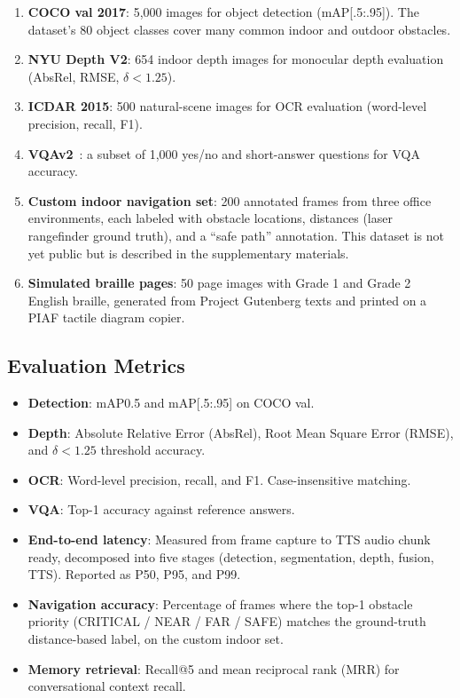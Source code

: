 \begin{enumerate}
    \item \textbf{COCO val 2017}: 5,000 images for object detection (mAP\@[.5:.95]). The dataset's 80 object classes cover many common indoor and outdoor obstacles.
    \item \textbf{NYU Depth V2}: 654 indoor depth images for monocular depth evaluation (AbsRel, RMSE, $\delta < 1.25$).
    \item \textbf{ICDAR 2015}: 500 natural-scene images for OCR evaluation (word-level precision, recall, F1).
    \item \textbf{VQAv2}~\cite{antol2015vqa}: a subset of 1,000 yes/no and short-answer questions for VQA accuracy.
    \item \textbf{Custom indoor navigation set}: 200 annotated frames from three office environments, each labeled with obstacle locations, distances (laser rangefinder ground truth), and a ``safe path'' annotation. This dataset is not yet public but is described in the supplementary materials.
    \item \textbf{Simulated braille pages}: 50 page images with Grade 1 and Grade 2 English braille, generated from Project Gutenberg texts and printed on a PIAF tactile diagram copier.
\end{enumerate}

\subsection{Evaluation Metrics}

\begin{itemize}
    \item \textbf{Detection}: mAP\@0.5 and mAP\@[.5:.95] on COCO val.
    \item \textbf{Depth}: Absolute Relative Error (AbsRel), Root Mean Square Error (RMSE), and $\delta < 1.25$ threshold accuracy.
    \item \textbf{OCR}: Word-level precision, recall, and F1. Case-insensitive matching.
    \item \textbf{VQA}: Top-1 accuracy against reference answers.
    \item \textbf{End-to-end latency}: Measured from frame capture to TTS audio chunk ready, decomposed into five stages (detection, segmentation, depth, fusion, TTS). Reported as P50, P95, and P99.
    \item \textbf{Navigation accuracy}: Percentage of frames where the top-1 obstacle priority (CRITICAL / NEAR / FAR / SAFE) matches the ground-truth distance-based label, on the custom indoor set.
    \item \textbf{Memory retrieval}: Recall@5 and mean reciprocal rank (MRR) for conversational context recall.
\end{itemize}

